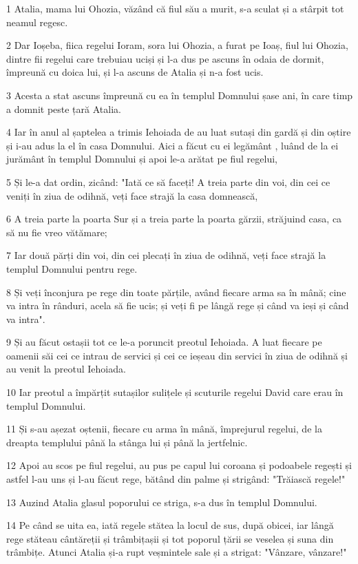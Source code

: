 \par 1 Atalia, mama lui Ohozia, văzând că fiul său a murit, s-a sculat și a stârpit tot neamul regesc.
\par 2 Dar Ioșeba, fiica regelui Ioram, sora lui Ohozia, a furat pe Ioaș, fiul lui Ohozia, dintre fii regelui care trebuiau uciși și l-a dus pe ascuns în odaia de dormit, împreună cu doica lui, și l-a ascuns de Atalia și n-a fost ucis.
\par 3 Acesta a stat ascuns împreună cu ea în templul Domnului șase ani, în care timp a domnit peste țară Atalia.
\par 4 Iar în anul al șaptelea a trimis Iehoiada de au luat sutași din gardă și din oștire și i-au adus la el în casa Domnului. Aici a făcut cu ei legământ , luând de la ei jurământ în templul Domnului și apoi le-a arătat pe fiul regelui,
\par 5 Și le-a dat ordin, zicând: "Iată ce să faceți! A treia parte din voi, din cei ce veniți în ziua de odihnă, veți face strajă la casa domnească,
\par 6 A treia parte la poarta Sur și a treia parte la poarta gărzii, străjuind casa, ca să nu fie vreo vătămare;
\par 7 Iar două părți din voi, din cei plecați în ziua de odihnă, veți face strajă la templul Domnului pentru rege.
\par 8 Și veți înconjura pe rege din toate părțile, având fiecare arma sa în mână; cine va intra în rânduri, acela să fie ucis; și veți fi pe lângă rege și când va ieși și când va intra".
\par 9 Și au făcut ostașii tot ce le-a poruncit preotul Iehoiada. A luat fiecare pe oamenii săi cei ce intrau de servici și cei ce ieșeau din servici în ziua de odihnă și au venit la preotul Iehoiada.
\par 10 Iar preotul a împărțit sutașilor sulițele și scuturile regelui David care erau în templul Domnului.
\par 11 Și s-au așezat oștenii, fiecare cu arma în mână, împrejurul regelui, de la dreapta templului până la stânga lui și până la jertfelnic.
\par 12 Apoi au scos pe fiul regelui, au pus pe capul lui coroana și podoabele regești și astfel l-au uns și l-au făcut rege, bătând din palme și strigând: "Trăiască regele!"
\par 13 Auzind Atalia glasul poporului ce striga, s-a dus în templul Domnului.
\par 14 Pe când se uita ea, iată regele stătea la locul de sus, după obicei, iar lângă rege stăteau cântăreții și trâmbițașii și tot poporul țării se veselea și suna din trâmbițe. Atunci Atalia și-a rupt veșmintele sale și a strigat: "Vânzare, vânzare!"

